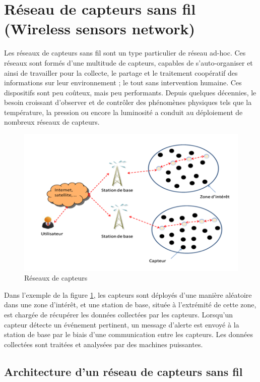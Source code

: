 \section{Réseau de capteurs sans fil (Wireless sensors network)}
Les réseaux de capteurs sans fil sont un type particulier de réseau ad-hoc. Ces réseaux sont formés d’une multitude de capteurs, capables de s’auto-organiser et ainsi de travailler pour la collecte, le partage et le traitement coopératif des informations sur leur environnement ; le tout sans intervention humaine. Ces dispositifs sont peu coûteux, mais peu performants. Depuis quelques décennies, le besoin croissant d’observer et de contrôler des phénomènes physiques tels que la température, la pression ou encore la luminosité a conduit au déploiement de nombreux réseaux de capteurs.

\begin{figure}[h]
\centering
\includegraphics[scale=0.8]{intro/WSN}
\caption{\label{WSN} Réseaux de capteurs}
\end{figure}

Dans l'exemple de la figure \ref{WSN}, les capteurs sont déployés d’une manière aléatoire dans une zone d’intérêt, et une station de base, située à l’extrémité de cette zone, est chargée de récupérer les données collectées par les capteurs. Lorsqu’un capteur détecte un événement pertinent, un message d’alerte est envoyé à la station de base par le biais d’une  communication entre les capteurs. Les données collectées sont traitées et analysées par des machines puissantes.



\subsection{Architecture d’un réseau de capteurs sans fil}



